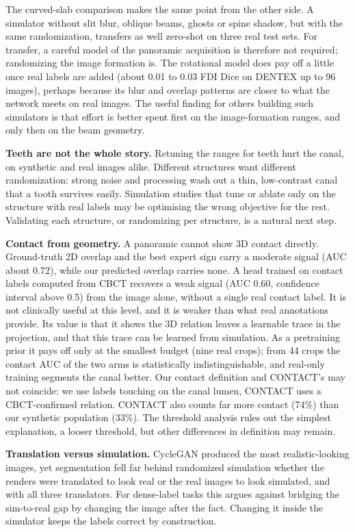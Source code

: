 \documentclass[preprint,12pt]{elsarticle}
\begin{document}
The curved-slab comparison makes the same point from the other side. A simulator without slit blur, oblique beams,
ghosts or spine shadow, but with the same randomization, transfers as well zero-shot on three real test sets. For
transfer, a careful model of the panoramic acquisition is therefore not required; randomizing the image formation is.
The rotational model does pay off a little once real labels are added (about 0.01 to 0.03 FDI Dice on DENTEX up to 96
images), perhaps because its blur and overlap patterns are closer to what the network meets on real images. The useful
finding for others building such simulators is that effort is better spent first on the image-formation ranges, and
only then on the beam geometry.

\textbf{Teeth are not the whole story.} Retuning the ranges for teeth hurt the canal, on synthetic and real images alike.
Different structures want different randomization: strong noise and processing wash out a thin, low-contrast canal that
a tooth survives easily. Simulation studies that tune or ablate only on the structure with real labels may be optimising
the wrong objective for the rest. Validating each structure, or randomizing per structure, is a natural next step.

\textbf{Contact from geometry.} A panoramic cannot show 3D contact directly. Ground-truth 2D overlap and the best expert
sign carry a moderate signal (AUC about 0.72), while our predicted overlap carries none. A head trained on contact
labels computed from CBCT recovers a weak signal (AUC 0.60, confidence interval above 0.5) from the image alone, without
a single real contact label. It is not clinically useful at this level, and it is weaker than what real annotations
provide. Its value is that it shows the 3D relation leaves a learnable trace in the projection,
and that this trace can be learned from simulation. As a pretraining prior it pays off only at the smallest budget (nine real crops); from 44
crops the contact AUC of the two arms is statistically indistinguishable, and real-only training segments the canal
better. Our contact definition
and CONTACT's may not coincide: we use labels touching on the canal lumen, CONTACT uses a CBCT-confirmed relation.
CONTACT also counts far more contact (74\%) than our synthetic population (33\%). The threshold analysis rules out the
simplest explanation, a looser threshold, but other differences in definition may remain.

\textbf{Translation versus simulation.} CycleGAN produced the most realistic-looking images, yet segmentation fell far
behind randomized simulation whether the renders were translated to look real or the real images to look simulated, and
with all three translators. For dense-label tasks this argues against bridging the sim-to-real gap by changing the image
after the fact. Changing it
inside the simulator keeps the labels correct by construction.
\end{document}

